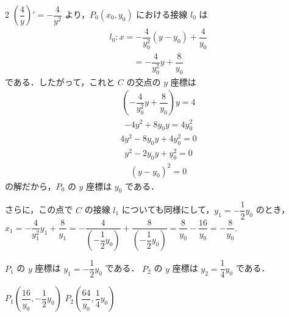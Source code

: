 \documentclass[../../main.tex]{subfiles}
\begin{document}
\begin{multicols}{2}
  $\left(\dfrac{4}{y}\right)' = -\dfrac{4}{y^2}$ より，$P_0(x_0, y_0)$ における接線 $l_0$ は
  \begin{align}
    l_0: x = -\dfrac{4}{y_0^2}(y-y_0) + \dfrac{4}{y_0}
  \end{align}
  \begin{align}
    = -\dfrac{4}{y_0^2}y + \dfrac{8}{y_0}
  \end{align}
  である．したがって，これと $C$ の交点の $y$ 座標は
  \begin{align}
    \left(-\dfrac{4}{y_0^2}y + \dfrac{8}{y_0}\right) y = 4
  \end{align}
  \begin{align}
    -4y^2 + 8y_0 y = 4y_0^2
  \end{align}
  \begin{align}
    4y^2 - 8y_0 y + 4y_0^2 = 0
  \end{align}
  \begin{align}
    y^2 - 2y_0 y + y_0^2 = 0
  \end{align}
  \begin{align}
    (y-y_0)^2 = 0
  \end{align}
  の解だから，$P_0$ の $y$ 座標は $y_0$ である．

  さらに，この点で $C$ の接線 $l_1$ についても同様にして，$y_1 = -\dfrac{1}{2}y_0$ のとき，$x_1 = -\dfrac{4}{y_1^2}y_1 + \dfrac{8}{y_1} = -\dfrac{4}{(-\dfrac{1}{2}y_0)} + \dfrac{8}{(-\dfrac{1}{2}y_0)} = \dfrac{8}{y_0} - \dfrac{16}{y_0} = -\dfrac{8}{y_0}$.

  $P_1$ の $y$ 座標は $y_1 = -\dfrac{1}{2}y_0$ である．
  $P_2$ の $y$ 座標は $y_2 = \dfrac{1}{4}y_0$ である．

  $P_1\left(\dfrac{16}{y_0}, -\dfrac{1}{2}y_0\right)$ $P_2\left(\dfrac{64}{y_0}, \dfrac{1}{4}y_0\right)$

  \newpage
\end{multicols}
\end{document}
